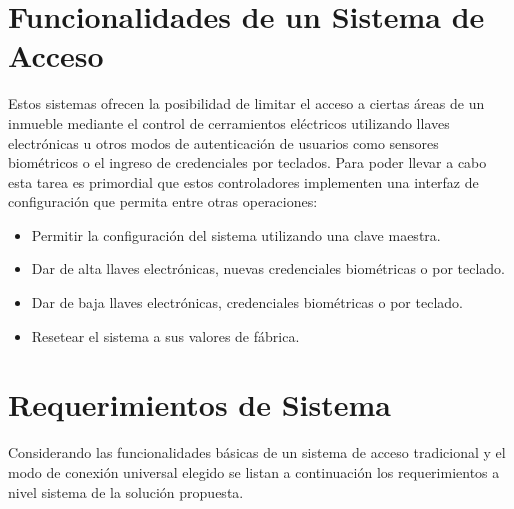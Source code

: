 \section{Funcionalidades de un Sistema de Acceso}
Estos sistemas ofrecen la posibilidad de limitar el acceso a ciertas áreas de un inmueble mediante el control de cerramientos eléctricos utilizando llaves electrónicas u otros modos de autenticación de usuarios como sensores biométricos o el ingreso de credenciales por teclados. Para poder llevar a cabo esta tarea es primordial que estos controladores implementen una interfaz de configuración que permita entre otras operaciones:
\begin{itemize}
	\item Permitir la configuración del sistema utilizando una clave maestra.
	\item Dar de alta llaves electrónicas, nuevas credenciales biométricas o por teclado.
	\item Dar de baja llaves electrónicas, credenciales biométricas o por teclado.
	\item Resetear el sistema a sus valores de fábrica.
\end{itemize}
\section{Requerimientos de Sistema}
Considerando las funcionalidades básicas de un sistema de acceso tradicional y el modo de conexión universal elegido se listan a continuación los requerimientos a nivel sistema de la solución propuesta.
